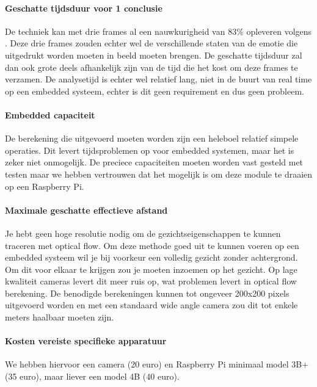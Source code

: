 \documentclass[11pt]{article}
\begin{document}
    \paragraph{Geschatte tijdsduur voor 1 conclusie}
    De techniek kan met drie frames al een nauwkurigheid van 83\% opleveren volgens \emph{\citet{An_Efficient_Algorithm_for_Motion_Detection_Based_Facial_Expression_Recognition_using_Optical_Flow}}. 
    Deze drie frames zouden echter wel de verschillende staten van de emotie die uitgedrukt worden moeten in beeld moeten brengen.
    De geschatte tijdsduur zal dan ook grote deels afhankelijk zijn van de tijd die het kost om deze frames te verzamen.
    De analysetijd is echter wel relatief lang, niet in de buurt van real time op een embedded systeem, echter is dit geen requirement en dus geen probleem.

    \paragraph{Embedded capaciteit}
    De berekening die uitgevoerd moeten worden zijn een heleboel relatief simpele operaties.
    Dit levert tijdsproblemen op voor embedded systemen, maar het is zeker niet onmogelijk.
    De preciece capaciteiten moeten worden vast gesteld met testen maar we hebben vertrouwen dat het mogelijk is om deze module te draaien op een Raspberry Pi.

    \paragraph{Maximale geschatte effectieve afstand}
    Je hebt geen hoge resolutie nodig om de gezichtseigenschappen te kunnen traceren met optical flow. 
    Om deze methode goed uit te kunnen voeren op een embedded systeem wil je bij voorkeur een volledig gezicht zonder achtergrond.
    Om dit voor elkaar te krijgen zou je moeten inzoemen op het gezicht. 
    Op lage kwaliteit cameras levert dit meer ruis op, wat problemen levert in optical flow berekening.
    De benodigde berekeningen kunnen tot ongeveer 200x200 pixels uitgevoerd worden en met een standaard wide angle camera zou dit tot enkele meters haalbaar moeten zijn.

    \paragraph{Kosten vereiste specifieke apparatuur}
    We hebben hiervoor een camera (20 euro) en Raspberry Pi minimaal model 3B+ (35 euro), maar liever een model 4B (40 euro). 
\end{document}
